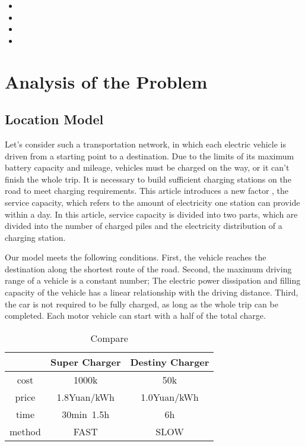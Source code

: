 \documentclass{mcmthesis}
\begin{document}
\begin{itemize}
\item
\item
\item
\item
\end{itemize}


\section{Analysis of the Problem}

\subsection {Location Model} 


      Let's consider such a transportation network, in which each electric vehicle is driven from a starting point to a destination. Due to the limits of its maximum battery capacity and mileage, vehicles must be charged on the way, or it can’t finish the whole trip. It is necessary to build sufficient charging stations on the road to meet charging requirements. This article introduces a new factor , the service capacity,  which refers to the amount of electricity one station can provide within a day.  In this article, service capacity is divided into two parts, which are divided into the number of charged piles and the electricity distribution of a charging station.

Our model meets the following conditions. First, the vehicle reaches the destination along the shortest route of the road. Second, the maximum driving range  of a vehicle is a constant number; The electric power dissipation and filling capacity of the vehicle has a linear relationship with the driving distance. Third, the car is not required to be fully charged, as long as the whole trip can be completed. Each motor vehicle can start with a half of the total charge.

\begin{table}[!htbp]
\centering
\begin{tabular}{|c|c|c|}
\hline
 &Super Charger&Destiny Charger \\
\hline
cost&1000k&50k\\
\hline
price& 1.8Yuan/kWh& 1.0Yuan/kWh\\
\hline
time& 30min~1.5h& 6h\\
\hline
method&FAST &SLOW \\
\hline
\end{tabular}
\caption{Compare}
\end{table}
\end{document}
